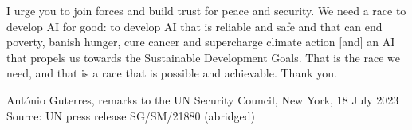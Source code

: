 {I urge you to join forces and build trust for peace and security. We need a race to develop AI for good: to develop AI that is reliable and safe and that can end poverty, banish hunger, cure cancer and supercharge climate action [and] an AI that propels us towards the Sustainable Development Goals. That is the race we need, and that is a race that is possible and achievable. Thank you.\par
\nolinenumbers}
\vspace{1.5mm}
\hfill{\small António Guterres, remarks to the UN Security Council, New York, 18 July 2023\\
\hspace*{\fill}Source: UN press release SG/SM/21880 (abridged)}

